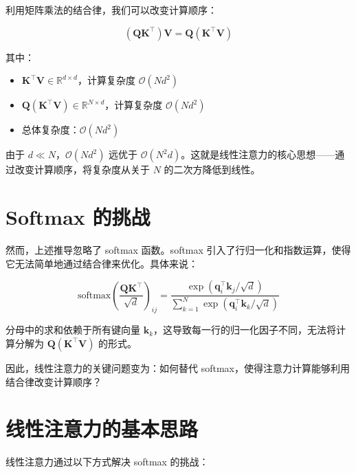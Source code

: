 利用矩阵乘法的结合律，我们可以改变计算顺序：

\begin{equation}
    (\mathbf{Q}\mathbf{K}^\top)\mathbf{V} = \mathbf{Q}(\mathbf{K}^\top\mathbf{V})
\end{equation}

其中：

\begin{itemize}
    \item $\mathbf{K}^\top\mathbf{V} \in \mathbb{R}^{d \times d}$，计算复杂度 $\mathcal{O}(Nd^2)$
    \item $\mathbf{Q}(\mathbf{K}^\top\mathbf{V}) \in \mathbb{R}^{N \times d}$，计算复杂度 $\mathcal{O}(Nd^2)$
    \item 总体复杂度：$\mathcal{O}(Nd^2)$
\end{itemize}

由于 $d \ll N$，$\mathcal{O}(Nd^2)$ 远优于 $\mathcal{O}(N^2 d)$。这就是线性注意力的核心思想——通过改变计算顺序，将复杂度从关于 $N$ 的二次方降低到线性。

\section{Softmax 的挑战}

然而，上述推导忽略了 softmax 函数。softmax 引入了行归一化和指数运算，使得它无法简单地通过结合律来优化。具体来说：

\begin{equation}
    \text{softmax}\left(\frac{\mathbf{Q}\mathbf{K}^\top}{\sqrt{d}}\right)_{ij} = \frac{\exp(\mathbf{q}_i^\top \mathbf{k}_j / \sqrt{d})}{\sum_{k=1}^N \exp(\mathbf{q}_i^\top \mathbf{k}_k / \sqrt{d})}
\end{equation}

分母中的求和依赖于所有键向量 $\mathbf{k}_k$，这导致每一行的归一化因子不同，无法将计算分解为 $\mathbf{Q}(\mathbf{K}^\top\mathbf{V})$ 的形式。

因此，线性注意力的关键问题变为：如何替代 softmax，使得注意力计算能够利用结合律改变计算顺序？

\section{线性注意力的基本思路}

线性注意力通过以下方式解决 softmax 的挑战：

